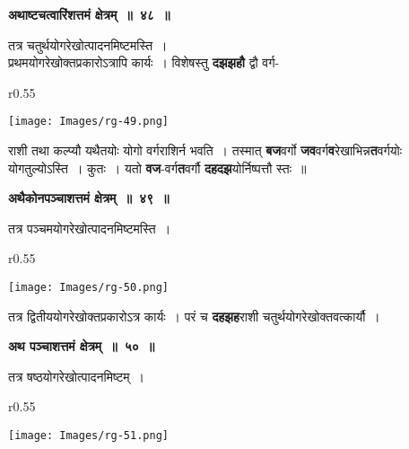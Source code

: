 \documentclass[11pt, openany]{book}
\begin{document}
\begin{center}
\textbf{\large अथाष्टचत्वारिंशत्तमं क्षेत्रम्~॥~४८~॥}
\end{center}

{\ab तत्र चतुर्थयोगरेखोत्पादनमिष्टमस्ति~। }\\

 प्रथमयोगरेखोक्तप्रकारोऽत्रापि कार्यः~। विशेषस्तु \textbf{दझझहौ} द्वौ वर्ग-

\newpage

\begin{wrapfigure}{r}{0.55\textwidth}
\vspace{-6mm}
\begin{flushright}
\texttt{[image: Images/rg-49.png]}
\end{flushright}
\vspace{-8mm}
\end{wrapfigure}

राशी तथा कल्प्यौ यथैतयोः योगो वर्गराशिर्न भवति~। तस्मात् \textbf{बज}वर्गो \textbf{जव}वर्ग\textbf{व}रेखाभिन्न\textbf{त}वर्गयोः योगतुल्योऽस्ति~। कुतः~। यतो \textbf{वज}-वर्ग\textbf{त}वर्गौ \textbf{दहदझ}योर्निष्पत्तौ स्तः~॥
\vspace{2mm}

\begin{center}
\textbf{\large अथैकोनपञ्चाशत्तमं क्षेत्रम्~॥~४९~॥}
\end{center}

{\ab तत्र पञ्चमयोगरेखोत्पादनमिष्टमस्ति~। }\\

\begin{wrapfigure}{r}{0.55\textwidth}
\vspace{-12mm}
\begin{flushright}
\texttt{[image: Images/rg-50.png]}
\end{flushright}
\vspace{-8mm}
\end{wrapfigure}

तत्र द्वितीययोगरेखोक्तप्रकारोऽत्र कार्यः~। परं च \textbf{दहझह}राशी चतुर्थयोगरेखोक्तवत्कार्यौ~। \\
\vspace{2mm}

\begin{center}
\textbf{\large अथ पञ्चाशत्तमं क्षेत्रम्~॥~५०~॥}
\end{center}

{\ab तत्र षष्ठयोगरेखोत्पादनमिष्टम्~। }\\

\begin{wrapfigure}{r}{0.55\textwidth}
\vspace{-12mm}
\begin{flushright}
\texttt{[image: Images/rg-51.png]}
\end{flushright}
\vspace{-8mm}
\end{wrapfigure}
\end{document}
